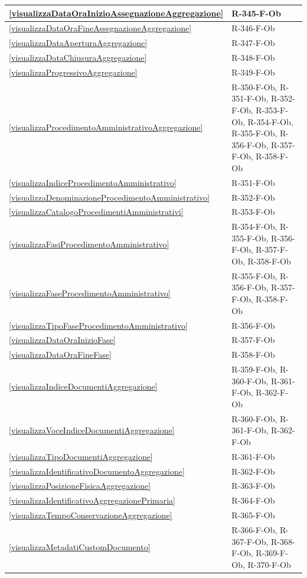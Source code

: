 \begin{longtable}{|p{4cm}|p{10cm}|}
\hline
\ref{visualizzaDataOraInizioAssegnazioneAggregazione} & R-345-F-Ob \\
\hline
\ref{visualizzaDataOraFineAssegnazioneAggregazione} & R-346-F-Ob \\
\hline
\ref{visualizzaDataAperturaAggregazione} & R-347-F-Ob \\
\hline
\ref{visualizzaDataChiusuraAggregazione} & R-348-F-Ob \\
\hline
\ref{visualizzaProgressivoAggregazione} & R-349-F-Ob \\
\hline
\ref{visualizzaProcedimentoAmministrativoAggregazione} & R-350-F-Ob, R-351-F-Ob, R-352-F-Ob, R-353-F-Ob, R-354-F-Ob, R-355-F-Ob, R-356-F-Ob, R-357-F-Ob, R-358-F-Ob \\
\hline
\ref{visualizzaIndiceProcedimentoAmministrativo} & R-351-F-Ob \\
\hline
\ref{visualizzaDenominazioneProcedimentoAmministrativo} & R-352-F-Ob \\
\hline
\ref{visualizzaCatalogoProcedimentiAmministrativi} & R-353-F-Ob \\
\hline
\ref{visualizzaFasiProcedimentoAmministrativo} & R-354-F-Ob, R-355-F-Ob, R-356-F-Ob, R-357-F-Ob, R-358-F-Ob \\
\hline
\ref{visualizzaFaseProcedimentoAmministrativo} & R-355-F-Ob, R-356-F-Ob, R-357-F-Ob, R-358-F-Ob \\
\hline
\ref{visualizzaTipoFaseProcedimentoAmministrativo} & R-356-F-Ob \\
\hline
\ref{visualizzaDataOraInizioFase} & R-357-F-Ob \\
\hline
\ref{visualizzaDataOraFineFase} & R-358-F-Ob \\
\hline
\ref{visualizzaIndiceDocumentiAggregazione} & R-359-F-Ob, R-360-F-Ob, R-361-F-Ob, R-362-F-Ob \\
\hline
\ref{visualizzaVoceIndiceDocumentiAggregazione} & R-360-F-Ob, R-361-F-Ob, R-362-F-Ob \\
\hline
\ref{visualizzaTipoDocumentiAggregazione} & R-361-F-Ob \\
\hline
\ref{visualizzaIdentificativoDocumentoAggregazione} & R-362-F-Ob \\
\hline
\ref{visualizzaPosizioneFisicaAggregazione} & R-363-F-Ob \\
\hline
\ref{visualizzaIdentificativoAggregazionePrimaria} & R-364-F-Ob \\
\hline
\ref{visualizzaTempoConservazioneAggregazione} & R-365-F-Ob \\
\hline
\ref{visualizzaMetadatiCustomDocumento} & R-366-F-Ob, R-367-F-Ob, R-368-F-Ob, R-369-F-Ob, R-370-F-Ob \\

\end{longtable}
